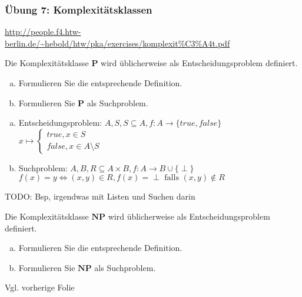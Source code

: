 \begin{card}
	\frametitle{Übung 7: Komplexitätsklassen}
	\url{http://people.f4.htw-berlin.de/~hebold/htw/pka/exercises/komplexit\%C3\%A4t.pdf}
\end{card}

\begin{card}
	Die Komplexitätsklasse $\mathbf{P}$ wird üblicherweise als Entscheidungsproblem definiert.
	\begin{enumerate}[a)]
	\item Formulieren Sie die entsprechende Definition.
	\item Formulieren Sie $\mathbf{P}$ als Suchproblem.
	\end{enumerate}
	\hr
	\begin{enumerate}[a)]
	\item Entscheidungsproblem: $A,S, S \subseteq A, f: A \rightarrow \{true, false\}$\\
	$x \mapsto \begin{cases} 
	true, x \in S \\
	false, x \in A \setminus S
	\end{cases}$
	\item Suchproblem: $A,B,R \subseteq A \times B, f: A \rightarrow B \cup \{\perp\}$\\
	$f(x) = y \Leftrightarrow (x,y) \in R, f(x) = \perp \text{ falls } (x,y) \notin R$
	\end{enumerate}
	TODO: Bsp, irgendwas mit Listen und Suchen darin
\end{card}

\begin{card}
	Die Komplexitätsklasse $\mathbf{NP}$ wird üblicherweise als Entscheidungsproblem definiert.
	\begin{enumerate}[a)]
	\item Formulieren Sie die entsprechende Definition.
	\item Formulieren Sie $\mathbf{NP}$ als Suchproblem. 
	\end{enumerate}
	\hr
	Vgl. vorherige Folie
\end{card}

